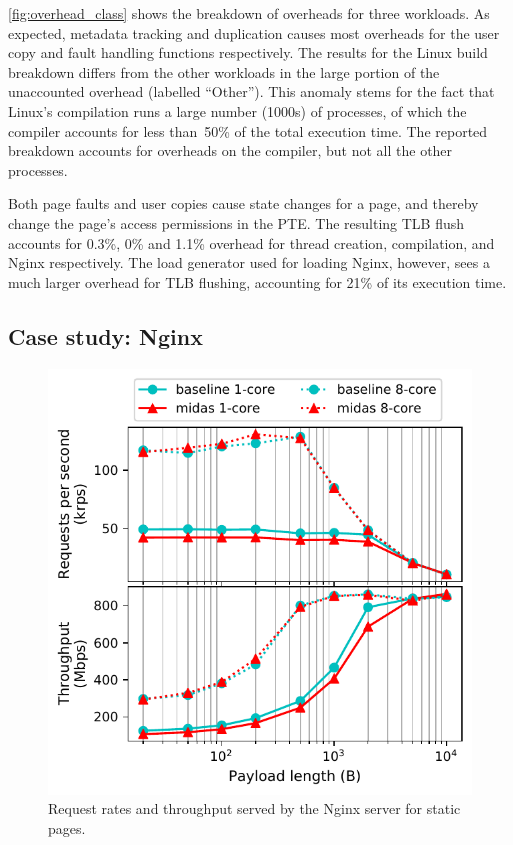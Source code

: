 \documentclass[letterpaper,twocolumn,10pt]{article}
\begin{document}
\autoref{fig:overhead_class} shows the breakdown of overheads for three
workloads.
As expected, metadata tracking and duplication causes most overheads
for the user copy and fault handling functions respectively.
The results for the Linux build breakdown differs 
from the other workloads
in the large portion of
the unaccounted overhead (labelled ``Other'').
This anomaly stems for the fact that Linux's compilation runs a large number (1000s)
of processes, of which the compiler accounts for less than~50\% of the
total execution time.
The reported breakdown accounts for overheads on the compiler, but not
all the other processes.

Both page faults and user copies cause state changes for a page, and thereby
change the page's access permissions in the PTE.
The resulting TLB flush accounts for 0.3\%, 0\% and 1.1\% overhead for
thread creation, compilation, and Nginx respectively.
The load generator  used for loading Nginx, however, sees
a much larger overhead for TLB flushing, accounting for
21\% of its execution time.

\subsection{Case study: Nginx}

\begin{figure}
  \centering
  \includegraphics[width=\linewidth]{img/nginx_performance.pdf}
  \caption{Request rates and throughput served by the Nginx server for
          static pages.}
  \label{fig:nginx_perf}
\end{figure}
\end{document}
